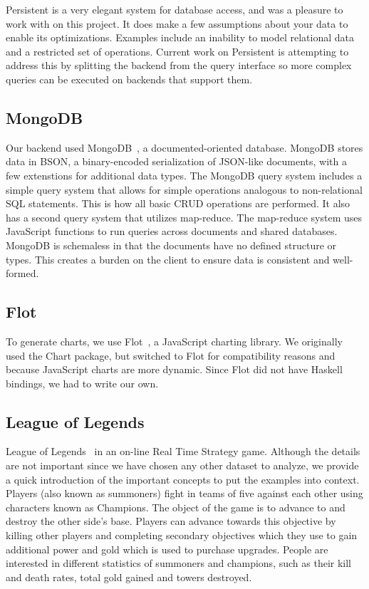 \documentclass{chi2009}
\begin{document}
Persistent is a very elegant system for database access, and was a pleasure to work with on this project.  It does make a few assumptions about your data to enable its optimizations.  Examples include an inability to model relational data and a restricted set of operations.  Current work on Persistent is attempting to address this by splitting the backend from the query interface so more complex queries can be executed on backends that support them.

\subsection{MongoDB}

Our backend used MongoDB~\cite{mongo}, a documented-oriented database. MongoDB stores data in BSON, a binary-encoded serialization of JSON-like documents, with a few extenstions for additional data types.  The MongoDB query system includes a simple query system that allows for simple operations analogous to non-relational SQL statements.  This is how all basic CRUD operations are performed.  It also has a second query system that utilizes map-reduce.  The map-reduce system uses JavaScript functions to run queries across documents and shared databases.  MongoDB is schemaless in that the documents have no defined structure or types.  This creates a burden on the client to ensure data is consistent and well-formed.

\subsection{Flot}

To generate charts, we use Flot~\cite{flot}, a JavaScript charting library. We originally used the Chart package, but switched to Flot for compatibility reasons and because JavaScript charts are more dynamic. Since Flot did not have Haskell bindings, we had to write our own. 

\subsection{League of Legends}

League of Legends~\cite{lol} in an on-line Real Time Strategy game. Although the details are not important since we have chosen any other dataset to analyze, we provide a quick introduction of the important concepts to put the examples into context. Players (also known as summoners) fight in teams of five against each other using characters known as Champions. The object of the game is to advance to and destroy the other side's base. Players can advance towards this objective by killing other players and completing secondary objectives which they use to gain additional power and gold which is used to purchase upgrades. People are interested in different statistics of summoners and champions, such as their kill and death rates, total gold gained and towers destroyed.
\end{document}
